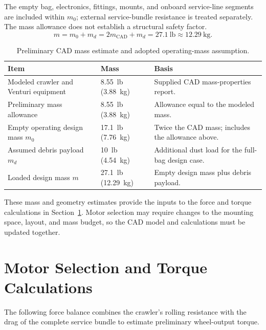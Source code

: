 The empty bag, electronics, fittings, mounts, and onboard service-line segments are included within $m_0$; external service-bundle resistance is treated separately. The mass allowance does not establish a structural safety factor.
\begin{equation}
 m=m_0+m_d=2m_{\mathrm{CAD}}+m_d=27.1~\mathrm{lb}\approx12.29~\mathrm{kg}.
 \label{eq:crawler-mass}
\end{equation}

\begin{table}[htbp]
\centering
\caption{Preliminary CAD mass estimate and adopted operating-mass assumption.}
\label{tab:crawler-mass-budget}
\begingroup\small\singlespacing
\renewcommand{\arraystretch}{1.2}
\begin{tabularx}{\textwidth}{@{}p{}p{}X@{}}
\toprule
Item & Mass & Basis \\
\midrule
Modeled crawler and Venturi equipment & 8.55~lb (3.88~kg) & Supplied CAD mass-properties report. \\
Preliminary mass allowance & 8.55~lb (3.88~kg) & Allowance equal to the modeled mass. \\
Empty operating design mass $m_0$ & 17.1~lb (7.76~kg) & Twice the CAD mass; includes the allowance above. \\
Assumed debris payload $m_d$ & 10~lb (4.54~kg) & Additional dust load for the full-bag design case. \\
Loaded design mass $m$ & 27.1~lb (12.29~kg) & Empty design mass plus debris payload. \\
\bottomrule
\end{tabularx}
\endgroup
\end{table}

These mass and geometry estimates provide the inputs to the force and torque calculations in Section~\ref{sec:motor-verification}. Motor selection may require changes to the mounting space, layout, and mass budget, so the CAD model and calculations must be updated together.


\section{Motor Selection and Torque Calculations}
\label{sec:motor-verification}
The following force balance combines the crawler's rolling resistance with the drag of the complete service bundle to estimate preliminary wheel-output torque.

